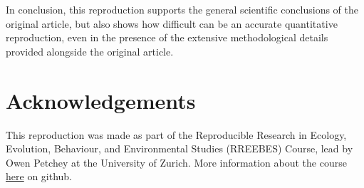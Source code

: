 \documentclass[10pt,a4paper,onecolumn]{article}
\begin{document}
In conclusion, this reproduction supports the general scientific
conclusions of the original article, but also shows how difficult can be
an accurate quantitative reproduction, even in the presence of the
extensive methodological details provided alongside the original
article.

\section{Acknowledgements}\label{acknowledgements}

This reproduction was made as part of the Reproducible Research in
Ecology, Evolution, Behaviour, and Environmental Studies (RREEBES)
Course, lead by Owen Petchey at the University of Zurich. More
information about the course
\href{https://github.com/opetchey/RREEBES/blob/master/README.md}{here}
on github.

{\sffamily \small
  \printbibliography[title=References]
}
\end{document}
